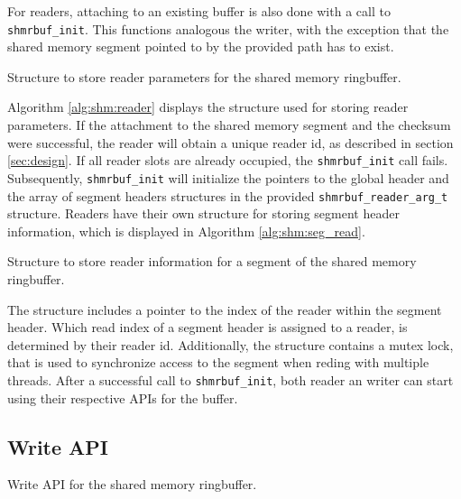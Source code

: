 \par
For readers, attaching to an existing buffer is also done with a call to \texttt{shmrbuf\_init}. This functions analogous the writer, with the exception that the
shared memory segment pointed to by the provided path has to exist. 
\begin{algorithm}[h!]
    
    \label{alg:shm:reader_arg}
    \caption[Shared Memory Ringbuffer: Reader Parameters]{Structure to store reader parameters for the shared memory ringbuffer.}
\end{algorithm}
Algorithm \ref{alg:shm:reader} displays the structure used for storing reader parameters. If the attachment to the shared memory segment
and the checksum were successful, the reader will obtain a unique reader id, as described in section \ref{sec:design}. If all reader slots are already occupied, the \texttt{shmrbuf\_init} call fails.
Subsequently, \texttt{shmrbuf\_init} will initialize the pointers to the global header and the array of segment headers structures in the provided \texttt{shmrbuf\_reader\_arg\_t} structure.  
Readers have their own structure for storing segment header information, which is displayed in Algorithm \ref{alg:shm:seg_read}.  
\begin{algorithm}[h!]
    
    \label{alg:shm:seg_read}
    \caption[Shared Memory Ringbuffer: Reader Segment Header]{Structure to store reader information for a segment of the shared memory ringbuffer.}
\end{algorithm}

The structure includes a pointer to the index of the reader within the segment header. Which read index of a segment header is assigned to a reader, is determined 
by their reader id. Additionally, the structure contains a mutex lock, that is used to synchronize access to the segment when reding with multiple threads.
After a successful call to \texttt{shmrbuf\_init}, both reader an writer can start using their respective APIs for the buffer.

\subsection{Write API}

\begin{algorithm}[h!]
    
    \label{alg:shm:write_api}
    \caption[Shared Memory Ringbuffer: Write API]{Write API for the shared memory ringbuffer.}
\end{algorithm}

